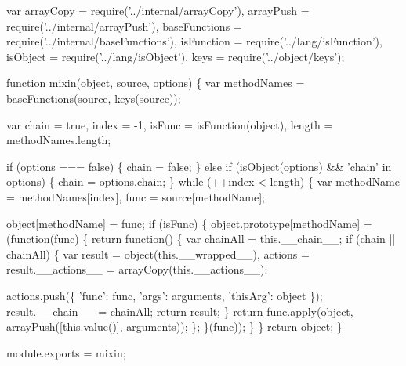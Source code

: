 \begin{DoxyCodeInclude}
var arrayCopy = require(\textcolor{stringliteral}{'../internal/arrayCopy'}),
    arrayPush = require(\textcolor{stringliteral}{'../internal/arrayPush'}),
    baseFunctions = require(\textcolor{stringliteral}{'../internal/baseFunctions'}),
    isFunction = require(\textcolor{stringliteral}{'../lang/isFunction'}),
    isObject = require(\textcolor{stringliteral}{'../lang/isObject'}),
    keys = require(\textcolor{stringliteral}{'../object/keys'});

\textcolor{keyword}{function} mixin(\textcolor{keywordtype}{object}, source, options) \{
  var methodNames = baseFunctions(source, keys(source));

  var chain = \textcolor{keyword}{true},
      index = -1,
      isFunc = isFunction(\textcolor{keywordtype}{object}),
      length = methodNames.length;

  \textcolor{keywordflow}{if} (options === \textcolor{keyword}{false}) \{
    chain = \textcolor{keyword}{false};
  \} \textcolor{keywordflow}{else} \textcolor{keywordflow}{if} (isObject(options) && \textcolor{stringliteral}{'chain'} in options) \{
    chain = options.chain;
  \}
  \textcolor{keywordflow}{while} (++index < length) \{
    var methodName = methodNames[index],
        func = source[methodName];

    \textcolor{keywordtype}{object}[methodName] = func;
    \textcolor{keywordflow}{if} (isFunc) \{
      \textcolor{keywordtype}{object}.prototype[methodName] = (\textcolor{keyword}{function}(func) \{
        \textcolor{keywordflow}{return} \textcolor{keyword}{function}() \{
          var chainAll = this.\_\_chain\_\_;
          \textcolor{keywordflow}{if} (chain || chainAll) \{
            var result = object(this.\_\_wrapped\_\_),
                actions = result.\_\_actions\_\_ = arrayCopy(this.\_\_actions\_\_);

            actions.push(\{ \textcolor{stringliteral}{'func'}: func, \textcolor{stringliteral}{'args'}: arguments, \textcolor{stringliteral}{'thisArg'}: \textcolor{keywordtype}{object} \});
            result.\_\_chain\_\_ = chainAll;
            \textcolor{keywordflow}{return} result;
          \}
          \textcolor{keywordflow}{return} func.apply(\textcolor{keywordtype}{object}, arrayPush([this.value()], arguments));
        \};
      \}(func));
    \}
  \}
  \textcolor{keywordflow}{return} object;
\}

module.exports = mixin;
\end{DoxyCodeInclude}
 